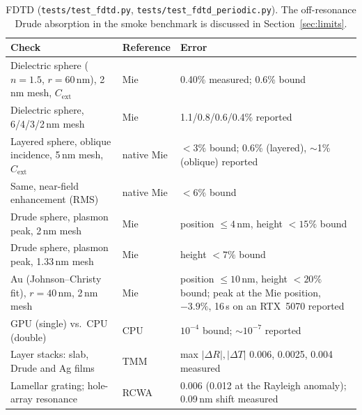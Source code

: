 \documentclass[11pt]{article}
\newcommand{\code}[1]{\texttt{#1}}
\begin{document}
\begin{table}[ht]
\centering\small
\begin{tabularx}{\linewidth}{@{}Xll@{}}
\toprule
Check & Reference & Error \\
\midrule
Dielectric sphere ($n=1.5$, $r=60$\,nm), 2\,nm mesh, $C_\mathrm{ext}$ & Mie & 0.40\% measured; 0.6\% bound \\
Dielectric sphere, 6/4/3/2\,nm mesh & Mie & 1.1/0.8/0.6/0.4\% reported \\
Layered sphere, oblique incidence, 5\,nm mesh, $C_\mathrm{ext}$ & native Mie & $<3\%$ bound; 0.6\% (layered), $\sim$1\% (oblique) reported \\
Same, near-field enhancement (RMS) & native Mie & $<6\%$ bound \\
Drude sphere, plasmon peak, 2\,nm mesh & Mie & position $\le4$\,nm, height $<15\%$ bound \\
Drude sphere, plasmon peak, 1.33\,nm mesh & Mie & height $<7\%$ bound \\
Au (Johnson--Christy fit), $r=40$\,nm, 2\,nm mesh & Mie & position $\le10$\,nm, height $<20\%$ bound; peak at the Mie position, $-3.9\%$, 16\,s on an RTX~5070 reported \\
GPU (single) vs.\ CPU (double) & CPU & $10^{-4}$ bound; $\sim10^{-7}$ reported \\
Layer stacks: slab, Drude and Ag films & TMM & max $|\Delta R|,|\Delta T|$ 0.006, 0.0025, 0.004 measured \\
Lamellar grating; hole-array resonance & RCWA & 0.006 (0.012 at the Rayleigh anomaly); 0.09\,nm shift measured \\
\bottomrule
\end{tabularx}
\caption{FDTD (\code{tests/test\_fdtd.py}, \code{tests/test\_fdtd\_periodic.py}). The off-resonance
Drude absorption in the smoke benchmark is discussed in Section~\ref{sec:limits}.}
\label{tab:val-fdtd}
\end{table}
\end{document}
